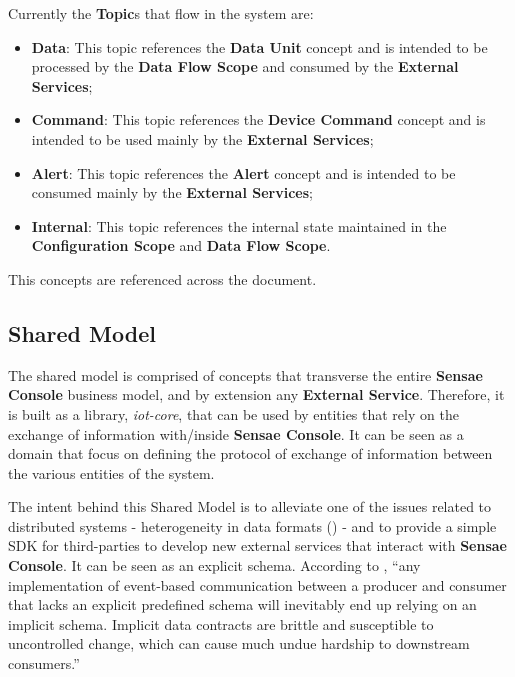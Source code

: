 Currently the \textbf{Topic}s that flow in the system are:

\begin{itemize}
   \item \textbf{Data}: This topic references the \textbf{Data Unit} concept and is intended to be processed by the \textbf{Data Flow Scope} and consumed by the \textbf{External Services};
   \item \textbf{Command}: This topic references the \textbf{Device Command} concept and is intended to be used mainly by the \textbf{External Services};
   \item \textbf{Alert}: This topic references the \textbf{Alert} concept and is intended to be consumed mainly by the \textbf{External Services};
   \item \textbf{Internal}: This topic references the internal state maintained in the \textbf{Configuration Scope} and \textbf{Data Flow Scope}.
\end{itemize}

This concepts are referenced across the document.

\subsection{Shared Model}
\label{subsec:design:domain:shared_model}

The shared model is comprised of concepts that transverse the entire \textbf{Sensae Console} business model, and by extension any \textbf{External Service}. Therefore, it is built as a library, \textit{iot-core}, that can be used by entities that rely on the exchange of information with/inside \textbf{Sensae Console}. It can be seen as a domain that focus on defining the protocol of exchange of information between the various entities of the system.

The intent behind this Shared Model is to alleviate one of the issues related to distributed systems - heterogeneity in data formats (\cite{nadiminti2006distributed}) - and to provide a simple \gls{SDK} for third-parties to develop new external services that interact with \textbf{Sensae Console}. It can be seen as an explicit schema. According to \cite{explicitsharedmodel}, ``any implementation of event-based communication between a producer and consumer that lacks an explicit predefined schema will inevitably end up relying on an implicit schema. Implicit data contracts are brittle and susceptible to uncontrolled change, which can cause much undue hardship to downstream consumers.''

